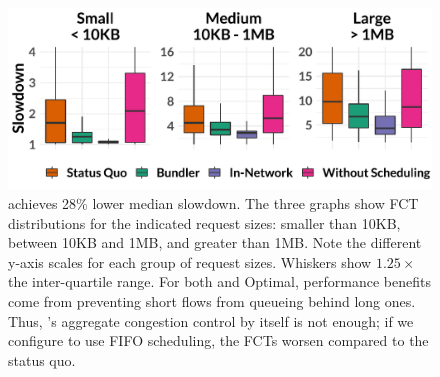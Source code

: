 \begin{figure}
    \centering
\begin{knitrout}
\color{fgcolor}
\includegraphics[width=\maxwidth]{figure/eval:best-1} 

\end{knitrout}
    \caption{\name achieves 28\% lower median slowdown. 
The three graphs show FCT distributions for the indicated request sizes: smaller than 10KB, between 10KB and 1MB, and greater than 1MB.  Note the different y-axis scales for each group of request sizes. Whiskers show $1.25 \times$ the inter-quartile range. 
For both \name and Optimal, performance benefits come from preventing short flows from queueing behind long ones. 
Thus, \name's aggregate congestion control by itself is not enough; if we configure \name to use FIFO scheduling, the FCTs worsen compared to the status quo.
    }
    \label{fig:eval:best}
\end{figure}
\newcommand{\overviewBenefitsBaselineMedian}{1.76\xspace}
\newcommand{\overviewBenefitsBaselineTail}{79.37\xspace}
\newcommand{\overviewBenefitsBundlerMedian}{1.26\xspace}
\newcommand{\overviewBenefitsBundlerTail}{41.38\xspace}
\newcommand{\overviewBenefitsOptimalMedian}{1.07\xspace}
\newcommand{\overviewBenefitsOptimalTail}{27.49\xspace}
\newcommand{\overviewBenefitsBundlerMedianImprovement}{28\%\xspace}

